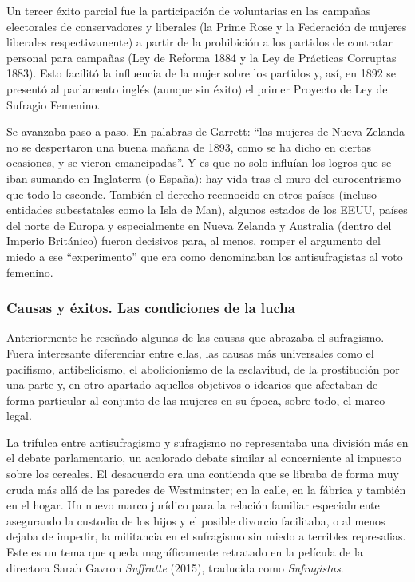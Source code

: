 \documentclass[
]{article}
\begin{document}
Un tercer éxito parcial fue la participación de voluntarias en las
campañas electorales de conservadores y liberales (la Prime Rose y la
Federación de mujeres liberales respectivamente) a partir de la
prohibición a los partidos de contratar personal para campañas (Ley de
Reforma 1884 y la Ley de Prácticas Corruptas 1883). Esto facilitó la
influencia de la mujer sobre los partidos y, así, en 1892 se presentó al
parlamento inglés (aunque sin éxito) el primer Proyecto de Ley de
Sufragio Femenino.

Se avanzaba paso a paso. En palabras de Garrett: ``las mujeres de Nueva
Zelanda no se despertaron una buena mañana de 1893, como se ha dicho en
ciertas ocasiones, y se vieron emancipadas''. Y es que no solo influían
los logros que se iban sumando en Inglaterra (o España): hay vida tras
el muro del eurocentrismo que todo lo esconde. También el derecho
reconocido en otros países (incluso entidades subestatales como la Isla
de Man), algunos estados de los EEUU, países del norte de Europa y
especialmente en Nueva Zelanda y Australia (dentro del Imperio
Británico) fueron decisivos para, al menos, romper el argumento del
miedo a ese ``experimento'' que era como denominaban los antisufragistas
al voto femenino.

\hypertarget{causas-y-uxe9xitos.-las-condiciones-de-la-lucha}{%
\subsubsection{Causas y éxitos. Las condiciones de la
lucha}\label{causas-y-uxe9xitos.-las-condiciones-de-la-lucha}}

Anteriormente he reseñado algunas de las causas que abrazaba el
sufragismo. Fuera interesante diferenciar entre ellas, las causas más
universales como el pacifismo, antibelicismo, el abolicionismo de la
esclavitud, de la prostitución por una parte y, en otro apartado
aquellos objetivos o idearios que afectaban de forma particular al
conjunto de las mujeres en su época, sobre todo, el marco legal.

La trifulca entre antisufragismo y sufragismo no representaba una
división más en el debate parlamentario, un acalorado debate similar al
concerniente al impuesto sobre los cereales. El desacuerdo era una
contienda que se libraba de forma muy cruda más allá de las paredes de
Westminster; en la calle, en la fábrica y también en el hogar. Un nuevo
marco jurídico para la relación familiar especialmente asegurando la
custodia de los hijos y el posible divorcio facilitaba, o al menos
dejaba de impedir, la militancia en el sufragismo sin miedo a terribles
represalias. Este es un tema que queda magníficamente retratado en la
película de la directora Sarah Gavron \emph{Suffratte} (2015), traducida
como \emph{Sufragistas}.
\end{document}
